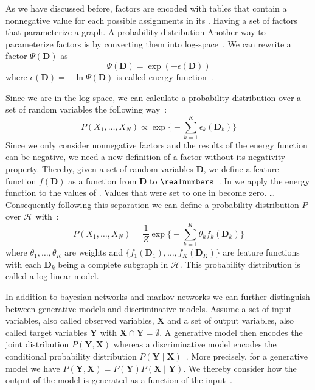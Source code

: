 As we have discussed before, \glspl{factor} are encoded with tables that contain a nonnegative value for each possible assignments in its .
Having a set of \glspl{factor} that parameterize a graph. A probability distribution
Another way to parameterize \glspl{factor} is by converting them into log-space~\citep{koller2009probabilistic}.
We can rewrite a factor $\Psi(\bm{D})$ as
\begin{equation*}
  \label{equ:energy-function}
  \Psi(\bm{D}) = \exp(-\epsilon(\bm{D}))
\end{equation*}
where $\epsilon(\bm{D})=-\ln\Psi(\bm{D})$ is called \gls{energy function}~\citep{koller2009probabilistic}.

Since we are in the log-space, we can calculate a \gls{probability distribution} over a set of \glspl{random variable} the following way~\citep{koller2009probabilistic}:
\begin{equation*}
  \label{equ:p-energy-function}
  P(X_1,\dots,X_N) \propto \exp\Bigg\{-\sum_{k=1}^K\epsilon_k(\bm{D}_k)\Bigg\}
\end{equation*}
Since we only consider nonnegative \glspl{factor} and the results of the \gls{energy function} can be negative, we need a new definition of a \gls{factor} without its negativity property.
Thereby, given a set of \glspl{random variable} $\bm{D}$, we define a \gls{feature function} $f(\bm{D})$ as a function from $\bm{D}$ to $\realnumbers$~\citep{koller2009probabilistic}.
In  we apply the \gls{energy function} to the values of .
Values that were set to one in  become zero. \dots{}
Consequently following this separation we can define a \gls{probability distribution} $P$ over $\mathcal{H}$ with~\citep{koller2009probabilistic}:
\begin{equation}
  \label{equ:log-linear-model}
  P(X_1,\dots,X_N) = \frac{1}{Z}\exp\Bigg\{-\sum_{k=1}^K \theta_k f_k(\bm{D}_k)\Bigg\}
\end{equation}
where $\theta_1,\dots,\theta_K$ are weights and $\{f_1(\bm{D}_1),\dots,f_K(\bm{D}_K)\}$ are \glspl{feature function} with each $\bm{D}_k$ being a complete subgraph in $\mathcal{H}$.
This \gls{probability distribution} is called a \gls{log-linear model}.

\bigskip

In addition to \glspl{bayesian network} and \glspl{markov network} we can further distinguish between \glspl{generative model} and \glspl{discriminative model}.
Assume a set of input variables, also called \glspl{observed variable}, $\bm{X}$ and a set of output variables, also called \glspl{target variable} $\bm{Y}$ with $\bm{X}\cap\bm{Y}=\emptyset$.
A \gls{generative model} then encodes the \gls{joint distribution} $P(\bm{Y},\bm{X})$ whereas a \gls{discriminative model} encodes the \gls{conditional probability distribution} $P(\bm{Y}\mid\bm{X})$~\citep{koller2009probabilistic}.
More precisely, for a \gls{generative model} we have $P(\bm{Y},\bm{X})=P(\bm{Y})P(\bm{X}\mid\bm{Y})$.
We thereby consider how the output of the model is generated as a function of the input~\citep{sutton2010introduction}.

